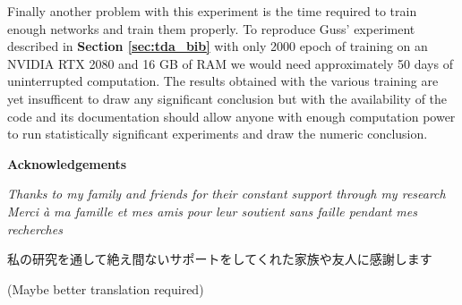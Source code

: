 \documentclass[12pt, a4paper]{article}
\begin{document}
Finally another problem with this experiment is the time required to train enough networks and train them properly. To reproduce Guss' experiment described in \textbf{Section \ref{sec:tda_bib}} with only 2000 epoch of training on an NVIDIA RTX 2080 and 16 GB of RAM we would need approximately 50 days of uninterrupted computation. The results obtained with the various training are yet insufficent to draw any significant conclusion but with the availability of the code and its documentation should allow anyone with enough computation power to run statistically significant experiments and draw the numeric conclusion.\\

\newpage
\thispagestyle{empty}
\mbox{}
\newpage





\newpage
\thispagestyle{empty}
\mbox{}
\newpage

{\LARGE \textbf{Acknowledgements}}

\vspace{20mm}

\textit{Thanks to my family and friends for their constant support through my research}\\

\textit{Merci à ma famille et mes amis pour leur soutient sans faille pendant mes recherches}\\

\begin{CJK}{UTF8}{min} 私の研究を通して絶え間ないサポートをしてくれた家族や友人に感謝します  \end{CJK} (Maybe better translation required)\\
\end{document}
